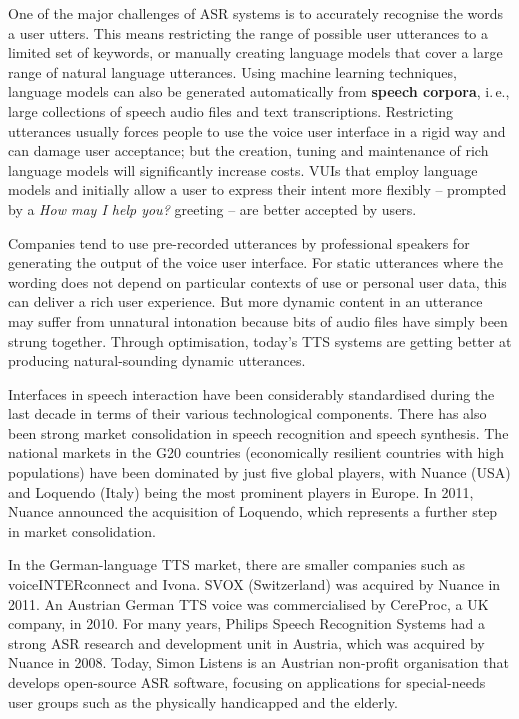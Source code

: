 \documentclass[]{../../metanetpaper}
\begin{document}
\begin{multicols}{2}
One of the major challenges of ASR systems is to accurately recognise the words a user utters. This means restricting the range of possible user utterances to a limited set of keywords, or manually creating language models that cover a large range of natural language utterances. Using machine learning techniques, language models can also be generated automatically from \textbf{speech corpora}, i.\,e., large collections of speech audio files and text transcriptions. Restricting utterances usually forces people to use the voice user interface in a rigid way and can damage user acceptance; but the creation, tuning and maintenance of rich language models will significantly increase costs. VUIs that employ language models and initially allow a user to express their intent more flexibly -- prompted by a \textit{How may I help you?} greeting -- are better accepted by users.


Companies tend to use pre-recorded utterances by professional speakers for generating the output of the voice user interface. For static utterances where the wording does not depend on particular contexts of use or personal user data, this can deliver a rich user experience. But more dynamic content in an utterance may suffer from unnatural intonation because bits of audio files have simply been strung together. Through optimisation, today’s TTS systems are getting better at producing natural-sounding dynamic utterances.

Interfaces in speech interaction have been considerably standardised during the last decade in terms of their various technological components. There has also been strong market consolidation in speech recognition and speech synthesis. The national markets in the G20 countries (economically resilient countries with high populations) have been dominated by just five global players, with Nuance (USA) and Loquendo (Italy) being the most prominent players in Europe. In 2011, Nuance announced the acquisition of Loquendo, which represents a further step in market consolidation.

In the German-language TTS market, there are smaller companies such as voiceINTERconnect and Ivona. SVOX (Switzerland) was acquired by Nuance in 2011. An Austrian German TTS voice was commercialised by CereProc, a UK company, in 2010. For many years, Philips Speech Recognition Systems had a strong ASR research and development unit in Austria, which was acquired by Nuance in 2008. Today, Simon Listens is an Austrian non-profit organisation that develops open-source ASR software, focusing on applications for special-needs user groups such as the physically handicapped and the elderly.


\end{multicols}
\end{document}
